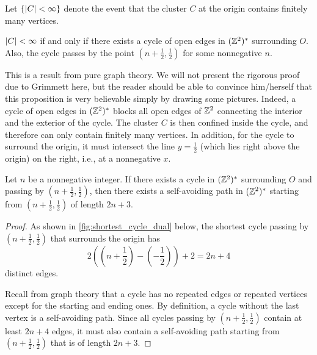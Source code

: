 \documentclass[a4paper, 12pt]{article}
\begin{document}
Let $\{\lvert C \rvert < \infty\}$ denote the event that the cluster $C$ at the origin contains finitely many vertices.

\begin{prop}\label{prop:c_finite_iff_cycle}
$\lvert C \rvert < \infty$ if and only if there exists a cycle of open edges in $(\mathbb{Z}^2)^*$ surrounding $O$. Also, the cycle passes by the point $(n + \frac{1}{2}, \frac{1}{2})$ for some nonnegative $n$.
\end{prop}

This is a result from pure graph theory. We will not present the rigorous proof due to Grimmett \autocite*[14--15]{grimmett_1999} here, but the reader should be able to convince him/herself that this proposition is very believable simply by drawing some pictures. Indeed, a cycle of open edges in $(\mathbb{Z}^2)^*$ blocks all open edges of $\mathbb{Z}^2$ connecting the interior and the exterior of the cycle. The cluster $C$ is then confined inside the cycle, and therefore can only contain finitely many vertices. In addition, for the cycle to surround the origin, it must intersect the line $y = \frac{1}{2}$ (which lies right above the origin) on the right, i.e., at a nonnegative $x$.

\begin{prop}\label{prop:cylce_implies_path}
Let $n$ be a nonnegative integer. If there exists a cycle in $(\mathbb{Z}^2)^*$ surrounding $O$ and passing by $(n + \frac{1}{2}, \frac{1}{2})$, then there exists a self-avoiding path in $(\mathbb{Z}^2)^*$ starting from $(n + \frac{1}{2}, \frac{1}{2})$ of length $2n + 3$.
\end{prop}
\begin{proof}
As shown in \cref{fig:shortest_cycle_dual} below, the shortest cycle passing by $(n + \frac{1}{2}, \frac{1}{2})$ that surrounds the origin has \[2\left((n + \frac{1}{2}) - (-\frac{1}{2})\right) + 2 = 2n + 4\] distinct edges.


Recall from graph theory that a cycle has no repeated edges or repeated vertices except for the starting and ending ones. By definition, a cycle without the last vertex is a self-avoiding path. Since all cycles passing by $(n + \frac{1}{2}, \frac{1}{2})$ contain at least $2n + 4$ edges, it must also contain a self-avoiding path starting from $(n + \frac{1}{2}, \frac{1}{2})$ that is of length $2n + 3$.
\end{proof}
\end{document}
